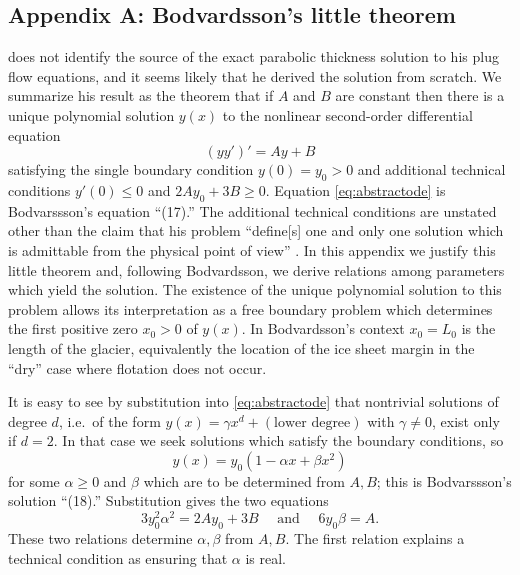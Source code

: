 \documentclass[twocolumn,letterpaper]{igs}
\begin{document}



\appendix

\subsection{Appendix A: Bodvardsson's little theorem}  \cite{Bodvardsson} does not identify the source of the exact parabolic thickness solution to his plug flow equations, and it seems likely that he derived the solution from scratch.  We summarize his result as the theorem that if $A$ and $B$ are constant then there is a unique polynomial solution $y(x)$ to the nonlinear second-order differential equation
\begin{equation}
  (y y')' = Ay+B  \label{eq:abstractode}
\end{equation}
satisfying the single boundary condition $y(0) = y_0 > 0$ and additional technical conditions $y'(0) \le 0$ and $2A y_0 + 3 B \ge 0$.  Equation \eqref{eq:abstractode} is Bodvarssson's equation ``(17).''  The additional technical conditions are unstated other than the claim that his problem ``define[s] one and only one solution which is admittable from the physical point of view'' \citep{Bodvardsson}.  In this appendix we justify this little theorem and, following Bodvardsson, we derive relations among parameters which yield the solution.  The existence of the unique polynomial solution to this problem allows its interpretation as a free boundary problem which determines the first positive zero $x_0>0$ of $y(x)$.  In Bodvardsson's context $x_0=L_0$ is the length of the glacier, equivalently the location of the ice sheet margin in the ``dry'' case where flotation does not occur.

It is easy to see by substitution into \eqref{eq:abstractode} that nontrivial solutions of degree $d$, i.e.~of the form $y(x) = \gamma x^d + (\text{lower degree})$ with $\gamma\ne 0$, exist only if $d=2$.  In that case we seek solutions which satisfy the boundary conditions, so
\begin{equation}
y(x) = y_0(1 - \alpha x + \beta x^2)  \label{eq:abstractsoln}
\end{equation}
for some $\alpha\ge 0$ and $\beta$ which are to be determined from $A,B$; this is Bodvarssson's solution ``(18).''  Substitution gives the two equations
\begin{equation}
3 y_0^2 \alpha^2 = 2 A y_0 + 3 B \quad \text{ and } \quad 6 y_0 \beta = A.  \label{eq:abstractrelations}
\end{equation}
These two relations determine $\alpha,\beta$ from $A,B$.  The first relation explains a technical condition as ensuring that $\alpha$ is real.
\end{document}
